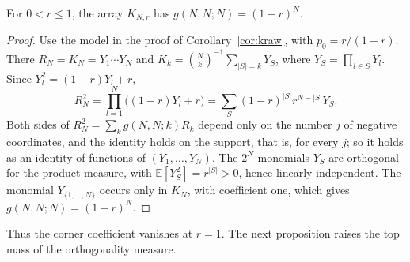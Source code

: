 \begin{lemma}\label{lem:corner-value}
For $0<r\leq1$, the array $K_{N,r}$ has $g(N,N;N)=(1-r)^N$.
\end{lemma}
\begin{proof}
Use the model in the proof of Corollary~\ref{cor:kraw}, with $p_0=r/(1+r)$. There $R_N=K_N=Y_1\cdots Y_N$ and $K_k=\binom Nk^{-1}\sum_{|S|=k}Y_S$, where $Y_S=\prod_{l\in S}Y_l$. Since $Y_l^2=(1-r)Y_l+r$,
\[
R_N^2=\prod_{l=1}^N\bigl((1-r)Y_l+r\bigr)=\sum_S(1-r)^{|S|}r^{N-|S|}Y_S.
\]
Both sides of $R_N^2=\sum_kg(N,N;k)R_k$ depend only on the number $j$ of negative coordinates, and the identity holds on the support, that is, for every $j$; so it holds as an identity of functions of $(Y_1,\ldots,Y_N)$. The $2^N$ monomials $Y_S$ are orthogonal for the product measure, with $\mathbb E[Y_S^2]=r^{|S|}>0$, hence linearly independent. The monomial $Y_{\{1,\ldots,N\}}$ occurs only in $K_N$, with coefficient one, which gives $g(N,N;N)=(1-r)^N$.
\end{proof}

Thus the corner coefficient vanishes at $r=1$. The next proposition raises the top mass of the orthogonality measure.

